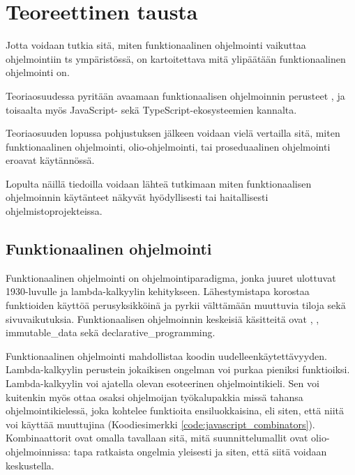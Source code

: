 \vspace{21.5pt}
\chapter{Teoreettinen tausta}

Jotta voidaan tutkia sitä, miten funktionaalinen ohjelmointi vaikuttaa ohjelmointiin \gls{ts} ympäristössä, on kartoitettava mitä ylipäätään funktionaalinen ohjelmointi on.

Teoriaosuudessa pyritään avaamaan funktionaalisen ohjelmoinnin perusteet , ja toisaalta myös JavaScript- sekä TypeScript-ekosysteemien kannalta.

Teoriaosuuden lopussa pohjustuksen jälkeen voidaan vielä vertailla sitä, miten funktionaalinen ohjelmointi, olio-ohjelmointi, tai proseduaalinen ohjelmointi eroavat käytännössä.

Lopulta näillä tiedoilla voidaan lähteä tutkimaan miten funktionaalisen ohjelmoinnin käytänteet näkyvät hyödyllisesti tai haitallisesti ohjelmistoprojekteissa.

\section{Funktionaalinen ohjelmointi}

Funktionaalinen ohjelmointi on ohjelmointiparadigma, jonka juuret ulottuvat 1930-luvulle ja lambda-kalkyylin kehitykseen. Lähestymistapa korostaa funktioiden käyttöä perusyksikköinä ja pyrkii välttämään muuttuvia tiloja sekä sivuvaikutuksia. Funktionaalisen ohjelmoinnin keskeisiä käsitteitä ovat , , \gls{immutable_data} sekä \gls{declarative_programming}. \citep{Tan2004,computerphile_lambda}


Funktionaalinen ohjelmointi mahdollistaa koodin uudelleenkäytettävyyden. Lambda-kalkyylin perustein jokaikisen ongelman voi purkaa pieniksi funktioiksi. \citep{BlellochHarper2015} Lambda-kalkyylin voi ajatella olevan esoteerinen ohjelmointikieli. Sen voi kuitenkin myös ottaa osaksi ohjelmoijan työkalupakkia missä tahansa ohjelmointikielessä, joka kohtelee funktioita ensiluokkaisina, eli siten, että niitä voi käyttää muuttujina (Koodiesimerkki \ref{code:javascript_combinators}). Kombinaattorit ovat omalla tavallaan sitä, mitä suunnittelumallit ovat olio-ohjelmoinnissa: tapa ratkaista ongelmia yleisesti ja siten, että siitä voidaan keskustella.

